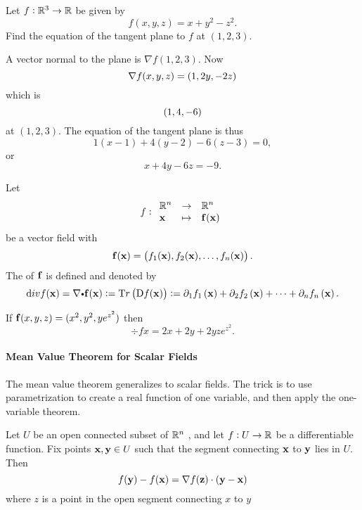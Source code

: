 \begin{exa}
Let $ f:\mathbb{R}^3 \rightarrow \mathbb{R}$ be given by
$$ f(x,y,z) = x + y^2  - z^2.$$Find the equation of
the tangent plane to $ f$ at $(1, 2, 3).$
\end{exa}
\begin{solu}  A vector normal to the plane is $\nabla f(1, 2, 3)$. Now
$$\nabla f(x,y,z) = \left( 1 ,2y ,-2z \right)$$which is
$$\left( 1 ,4 ,-6 \right)$$at $(1, 2, 3).$ The equation of the
tangent plane is thus
$$1(x - 1) + 4(y - 2) - 6(z - 3) = 0,$$or
$$x + 4y - 6z = -9.$$
\end{solu}
\begin{df}
Let $$\fun{f}{\point{x}}{\funvect{f}(\point{x})}{\reals^n}{\reals^n}$$be a
vector field with
$$\mathbf{ f}({\mathbf x}) = \left( f_1({\mathbf x}) ,f_2({\mathbf x}) ,\dots ,f_n({\mathbf x}) \right).$$
The  of $\mathbf{ f}$ is defined and denoted by
$$\div{f}{x} = \nabla\bp \funvect{f}(\point{x}) :=\Tr\left( \derivc f(\point{x})\right) :=   \partialds{1}{f_1}{x}  +  \partialds{2}{f_2}{x} +  \dots + \partialds{n}{f_n}{x}.$$
\end{df}
\begin{exa}If $\mathbf{ f}(x, y, z) = (x^2, y^2, ye^{z^2})$ then
$$\div{f}{x} = 2x + 2y + 2yze^{z^2}. $$
\end{exa}

\paragraph{Mean Value Theorem for Scalar Fields}
The mean value theorem generalizes to scalar fields. The trick is to use parametrization to create a real function
of one variable, and then apply the one-variable theorem.

\begin{thm}
 Let \(U\) be an open connected subset of \(\mathbb{R}^n\) , and let \(f:U\to\mathbb{R}\)
be a differentiable function. Fix points \(\mathbf{ x},\mathbf{ y}\in U\) such that the
 segment connecting $\mathbf{ x}$ to $\mathbf{ y}$ lies in \(U\). 
 Then \[f(\mathbf{ y})-f(\mathbf{ x})=\nabla f(\mathbf{ z})\cdot (\mathbf{ y}-\mathbf{ x})\]
where $z$ is a point in the open segment connecting $x$ to $y$
\end{thm}

